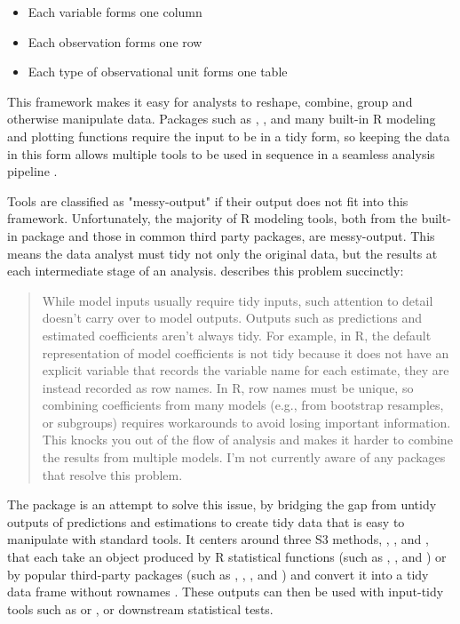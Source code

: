 \begin{itemize}
\item Each variable forms one column
\item Each observation forms one row
\item Each type of observational unit forms one table
\end{itemize}

This framework makes it easy for analysts to reshape, combine, group and otherwise manipulate data. Packages such as , , and many built-in R modeling and plotting functions require the input to be in a tidy form, so keeping the data in this form allows multiple tools to be used in sequence in a seamless analysis pipeline \citep{package:ggplot2,package:dplyr}.

Tools are classified as "messy-output" if their output does not fit into this framework. Unfortunately, the majority of R modeling tools, both from the built-in  package and those in common third party packages, are messy-output. This means the data analyst must tidy not only the original data, but the results at each intermediate stage of an analysis. \citet{Wickham:2014vp} describes this problem succinctly:

\begin{quote}
While model inputs usually require tidy inputs, such attention to detail doesn't carry over to model outputs. Outputs such as predictions and estimated coefficients aren't always tidy. For example, in R, the default representation of model coefficients is not tidy because it does not have an explicit variable that records the variable name for each estimate, they are instead recorded as row names. In R, row names must be unique, so combining coefficients from many models (e.g., from bootstrap resamples, or subgroups) requires workarounds to avoid losing important information. This knocks you out of the flow of analysis and makes it harder to combine the results from multiple models. I'm not currently aware of any packages that resolve this problem.
\end{quote}

The  package is an attempt to solve this issue, by bridging the gap from untidy outputs of predictions and estimations to create tidy data that is easy to manipulate with standard tools. It centers around three S3 methods, , , and , that each take an object produced by R statistical functions (such as , , and ) or by popular third-party packages (such as , , , and ) and convert it into a tidy data frame without rownames \citep{Friedman:2010wm,package:survival,package:lme4,package:multcomp}. These outputs can then be used with input-tidy tools such as  or , or downstream statistical tests.

